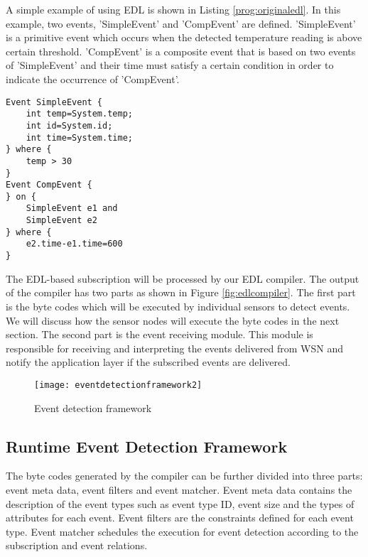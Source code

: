 A simple example of using EDL is shown in Listing \ref{prog:originaledl}. In this example, two events, 'SimpleEvent' and 'CompEvent' are defined. 'SimpleEvent' is a primitive event which occurs when the detected temperature reading is above certain threshold. 'CompEvent' is a composite event that is based on two events of 'SimpleEvent' and their time must satisfy a certain condition in order to indicate the occurrence of 'CompEvent'.
\begin{lstlisting}[caption=A simple EDL program, label=prog:originaledl]
Event SimpleEvent {
	int temp=System.temp;
	int id=System.id;
	int time=System.time;
} where {
	temp > 30
}
Event CompEvent {
} on {
	SimpleEvent e1 and
	SimpleEvent e2
} where {
	e2.time-e1.time=600
}
\end{lstlisting}

The EDL-based subscription will be processed by our EDL compiler. The output of the compiler has two parts as shown in Figure \ref{fig:edlcompiler}. The first part is the byte codes which will be executed by individual sensors to detect events. We will discuss how the sensor nodes will execute the byte codes in the next section. The second part is the event receiving module. This module is responsible for receiving and interpreting the events delivered from WSN and notify the application layer if the subscribed events are delivered.

\begin{figure}
\centering
\texttt{[image: eventdetectionframework2]}
\caption{Event detection framework}
\label{fig:eventdetectionframework2}
\end{figure}

\subsection{Runtime Event Detection Framework}
The byte codes generated by the compiler can be further divided into three parts: event meta data, event filters and event matcher. Event meta data contains the description of the event types such as event type ID, event size and the types of attributes for each event. Event filters are the constraints defined for each event type. Event matcher schedules the execution for event detection according to the subscription and event relations.

